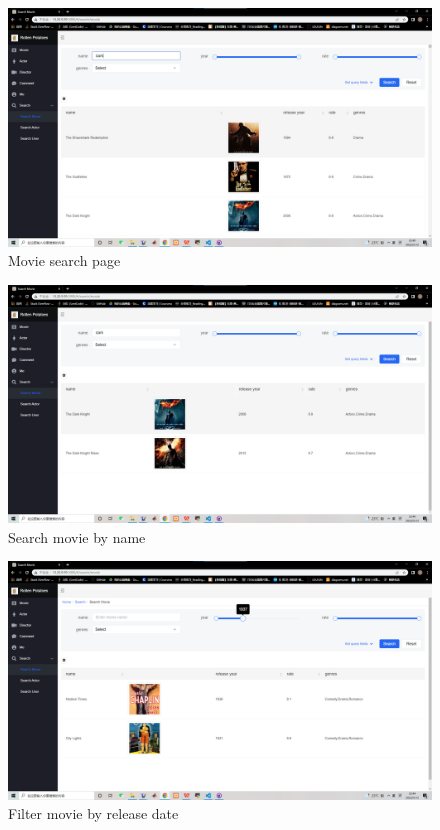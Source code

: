 \begin{CJK*}{UTF8}{gbsn}
\begin{figure}[htbp]
\centering
\includegraphics[width=1\textwidth]{res_search1.png}
\caption{Movie search page}
\end{figure}


\begin{figure}[htbp]
\centering
\includegraphics[width=1\textwidth]{res_search2.png}
\caption{Search movie by name}
\end{figure}

\begin{figure}[htbp]
\centering
\includegraphics[width=1\textwidth]{res_search3.png}
\caption{Filter movie by release date}
\end{figure}



\end{CJK*}
